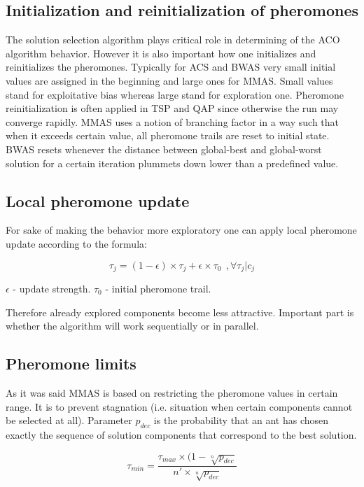 \subsection{Initialization and reinitialization of pheromones}

The solution selection algorithm plays critical role in determining of the ACO algorithm behavior. However it is also important how one initializes and reinitializes the pheromones. Typically for ACS and BWAS very small initial values are assigned in the beginning and large ones for MMAS. Small values stand for exploitative bias whereas large stand for exploration one. Pheromone reinitialization is often applied in TSP and QAP since otherwise the run may converge rapidly. MMAS uses a notion of branching factor in a way such that when it exceeds certain value, all pheromone trails are reset to initial state. BWAS resets whenever the distance between global-best and global-worst solution for a certain iteration plummets down lower than a predefined value.


\subsection{Local pheromone update}
For sake of making the behavior more exploratory one can apply local pheromone update according to the formula:

\begin{equation}
\tau_j = (1 - \epsilon) \times \tau_j + \epsilon \times \tau_0 \ \ ,\forall \tau_j | c_j
\end{equation}

$\epsilon$ - update strength. $\tau_0$ - initial pheromone trail.

Therefore already explored components become less attractive. Important part is whether the algorithm will work sequentially or in parallel.

\subsection{Pheromone limits}
As it was said MMAS is based on restricting the pheromone values in certain range. It is to prevent stagnation (i.e. situation when certain components cannot be selected at all). Parameter $p_{dec}$ is the probability that an ant has chosen exactly the sequence of solution components that correspond to the best solution.

\begin{equation}
\tau_{min} = \frac{\tau_{max} \times (1 - \sqrt[n]{p_{dec}}}{n' \times \sqrt[n]{p_{dec}}} 
\end{equation}

